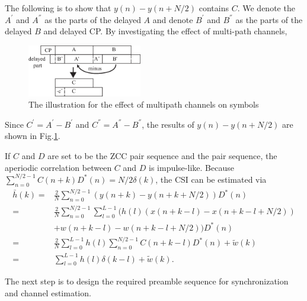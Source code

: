 \documentclass[10pt,journal]{IEEEtran}
\begin{document}
	The following is to show that $ y(n)-y(n+N/2) $ contains $ C $.
	We denote the $A^{'}$ and $A^{''}$ as the parts of the delayed $A$ and denote  $B^{'}$ and $B^{''}$ as the parts of the delayed $B$ and delayed CP.
	By investigating the effect of multi-path channels,
	\begin{figure}[htb]
        \captionsetup{belowskip=-5pt}
		\centering \includegraphics[width=5cm]{effect_of_channel_ACO_OFDM.eps}
		\caption{The illustration for the effect of multipath channels on symbols} \label{fig:effect_of_channel_ACO_OFDM}
	\end{figure}
	Since $C^{'}=A^{'}-B^{'}$ and $C^{''}=A^{''}-B^{''}$, the results of $y(n)-y(n+N/2)$ are shown in Fig.\ref{fig:effect_of_channel_ACO_OFDM}.

	If $C$ and $D$ are set to be the ZCC pair sequence and the pair sequence, the aperiodic correlation between $C$ and $D$ is impulse-like.
	Because $ \sum_{n=0}^{N/2-1}C(n+k)D^*(n)=N/2 \delta(k) $, the CSI can be estimated via
	\begin{align}\label{equ:gain_acquire}
          \bar{h}(k)=&\frac{2}{N}\sum_{n=0}^{N/2-1}(y(n+k)-y(n+k+N/2))D^*(n)\nonumber\\
          =&\frac{2}{N}\sum_{n=0}^{N/2-1}\sum_{l=0}^{L-1}(h(l)(x(n+k-l)-x(n+k-l+N/2))\nonumber\\
          &+w(n+k-l)-w(n+k-l+N/2))D^*(n)\nonumber\\
          =&\frac{2}{N}\sum_{l=0}^{L-1}h(l)\sum_{n=0}^{N/2-1}C(n+k-l)D^*(n)+\tilde{w}(k)\nonumber\\
          =&\sum_{l=0}^{L-1}h(l)\delta(k-l)+\tilde{w}(k).
    \end{align}

    The next step is to design the required preamble sequence for synchronization and channel estimation. %
\end{document}
